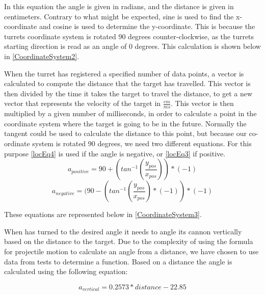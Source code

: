 In this equation the angle  is given in radians, and the distance
 is given in centimeters. Contrary to what might be expected, sine
is used to find the x-coordinate and cosine is used to determine the
y-coordinate. This is because the turrets coordinate system is rotated 90
degrees counter-clockwise, as the turrets starting direction is read as an angle
of 0 degrees. This calculation is shown below in \autoref{CoordinateSystem2}.


When the turret has registered a specified number of data points, a vector is
calculated to compute the distance that the target has travelled. This vector is
then divided by the time it takes the target to travel the distance, to get a
new vector that represents the velocity of the target in $\frac{cm}{ms}$. This
vector is then multiplied by a given number of milliseconds, in order to
calculate a point in the coordinate system where the target is going to be in
the future. Normally the tangent could be used to calculate the distance
to this point, but because our co-ordinate system is rotated 90 degrees, we need
two different equations. For this purpose \autoref{locEq4} is used if the angle is
negative, or \autoref{locEq3} if positive.
\begin{equation}\label{locEq3}
a_{positive}=90+(tan^{-1}(\frac{y_{pos}}{x_{pos}}))*(-1)
\end{equation} 
\begin{equation}\label{locEq4}
a_{negative}=(90-(tan^{-1}(\frac{y_{pos}}{x_{pos}})*(-1))*(-1)
\end{equation} 

These equations are represented below in \autoref{CoordinateSystem3}.


When \name has turned to the desired angle it needs to angle its cannon
vertically based on the distance to the target. Due to the complexity of using
the formula for projectile motion to calculate an angle from a distance, we have
chosen to use data from tests to determine a function. Based on a distance the
angle is calculated using the following equation:

\begin{equation}\label{locEq5}
a_{vertical}=0.2573*distance-22.85
\end{equation} 

